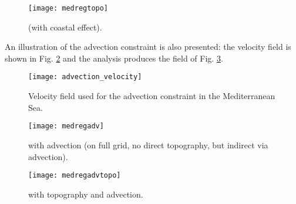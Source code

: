 \begin{figure}[H]
\centering
\parbox{.6\textwidth}{
\texttt{[image: medregtopo]}
}\parbox{.4\textwidth}{
\caption{\diva (with coastal effect).\label{fig:medregtopo} }
}
\end{figure}

An illustration of the advection constraint is also presented: the velocity field is shown in Fig. \ref{fig:medsea_vel} and the analysis produces the field of Fig. \ref{fig:medsea_adv}.

\begin{figure}[H]
\centering
\parbox{.6\textwidth}{
\texttt{[image: advection\_velocity]}
}\parbox{.4\textwidth}{
\caption{Velocity field used for the advection constraint in the Mediterranean Sea.\label{fig:medsea_vel}}
}
\end{figure}

\begin{figure}[H]
\centering
\parbox{.6\textwidth}{
\texttt{[image: medregadv]}
}\parbox{.4\textwidth}{
\caption{\diva with advection (on full grid, no direct topography, but indirect 
via advection).\label{fig:medsea_adv}}
}
\end{figure}


\begin{figure}[H]
\centering
\parbox{.6\textwidth}{
\texttt{[image: medregadvtopo]}
}\parbox{.4\textwidth}{
\caption{\diva with topography and advection.}
}
\end{figure}


